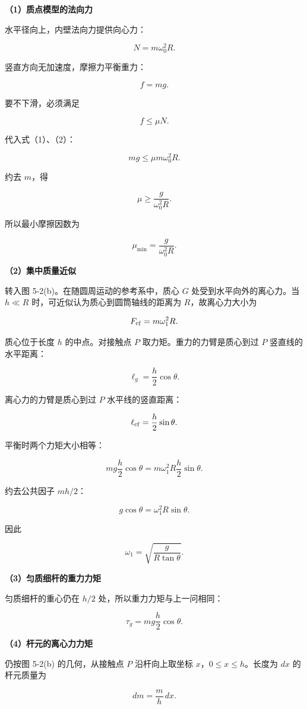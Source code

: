 \documentclass[12pt,a4paper,UTF8]{ctexart}
\begin{document}
\textbf{（1）质点模型的法向力}

水平径向上，内壁法向力提供向心力：

\[
N=m\omega_0^2R.\tag{1}
\]

竖直方向无加速度，摩擦力平衡重力：

\[
f=mg.\tag{2}
\]

要不下滑，必须满足

\[
f\leq\mu N.
\]

代入式（1）、（2）：

\[
mg\leq\mu m\omega_0^2R.
\]

约去 \(m\)，得

\[
\boxed{
\mu\geq\frac{g}{\omega_0^2R}
}.\tag{3}
\]

所以最小摩擦因数为

\[
\boxed{\mu_{\min}=\frac{g}{\omega_0^2R}}.
\]

\textbf{（2）集中质量近似}

转入图 5-2(b)。在随圆周运动的参考系中，质心 \(G\)
处受到水平向外的离心力。当 \(h\ll R\)
时，可近似认为质心到圆筒轴线的距离为 \(R\)，故离心力大小为

\[
F_{\rm cf}=m\omega_1^2R.
\]

质心位于长度 \(h\) 的中点。对接触点 \(P\) 取力矩。重力的力臂是质心到过
\(P\) 竖直线的水平距离：

\[
\ell_g=\frac h2\cos\theta.
\]

离心力的力臂是质心到过 \(P\) 水平线的竖直距离：

\[
\ell_{\rm cf}=\frac h2\sin\theta.
\]

平衡时两个力矩大小相等：

\[
mg\frac h2\cos\theta
=m\omega_1^2R\frac h2\sin\theta.
\]

约去公共因子 \(mh/2\)：

\[
g\cos\theta=\omega_1^2R\sin\theta.
\]

因此

\[
\boxed{
\omega_1
=\sqrt{\frac{g}{R\tan\theta}}
}.\tag{4}
\]

\textbf{（3）匀质细杆的重力力矩}

匀质细杆的重心仍在 \(h/2\) 处，所以重力力矩与上一问相同：

\[
\tau_g=mg\frac h2\cos\theta.\tag{5}
\]

\textbf{（4）杆元的离心力力矩}

仍按图 5-2(b) 的几何，从接触点 \(P\) 沿杆向上取坐标
\(x\)，\(0\leq x\leq h\)。长度为 \(dx\) 的杆元质量为

\[
dm=\frac mh\,dx.\tag{6}
\]
\end{document}
